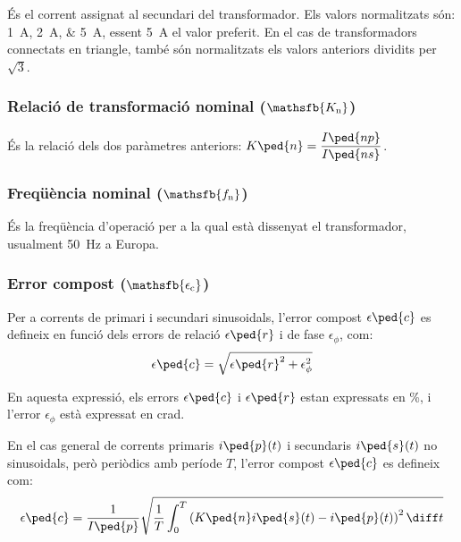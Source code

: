  És el corrent assignat al
secundari del transformador. Els valors normalitzats
són: \qtylist{1;2;5}{A}, essent \qty{5}{A} el valor preferit. En el cas de transformadors connectats en triangle, també són normalitzats els valors anteriors dividits per $ \sqrt{3}$.

\subsubsection{Relació de transformació nominal ($\mathsfb{K_\text{n}}$)}

És la relació dels dos  paràmetres anteriors: $K\ped{n} = \dfrac{I\ped{np}}{I\ped{ns}}$.

\subsubsection{Freqüència nominal ($\mathsfb{f_\text{n}}$)}

 És la freqüència d'operació per a la qual    està dissenyat el transformador, usualment \qty{50}{Hz} a Europa.

\subsubsection{Error compost ($\mathsfb{\epsilon_\text{c}}$)}

Per a corrents de primari i secundari sinusoidals, l'error compost $\epsilon\ped{c}$ es defineix  en funció dels errors de relació $\epsilon\ped{r}$ i de fase  $\epsilon_\phi$, com:
\begin{equation}
    \epsilon\ped{c} = \sqrt{\epsilon\ped{r}^2 +  \epsilon_\phi^2}
\end{equation}

En aquesta expressió, els errors $\epsilon\ped{c}$ i $\epsilon\ped{r}$  estan expressats en \si{\percent}, i l'error $\epsilon_\phi$ està expressat en crad.

En el cas general de corrents primaris $i\ped{p}(t)$ i secundaris $i\ped{s}(t)$ no sinusoidals, però periòdics amb període $T$, l'error compost $\epsilon\ped{c}$ es defineix com:
\begin{equation}
    \epsilon\ped{c} = \frac{1}{I\ped{p}} \sqrt{\frac{1}{T} \int_0^T \left(K\ped{n} i\ped{s}(t) - i\ped{p}(t)\right)^2 \diff t}
\end{equation}

